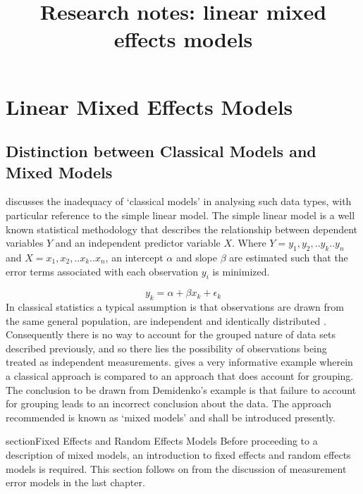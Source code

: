 \documentclass[12pt, a4paper]{report}
\title{Research notes: linear mixed effects models}
\author{ } \date{ }
\theoremstyle{plain}
\theoremstyle{definition}
\theoremstyle{remark}
\begin{document}
	\tableofcontents
\chapter{Linear Mixed Effects Models}

\section{Distinction between Classical Models and Mixed Models}
\citet{Demi} discusses the inadequacy of `classical models' in
analysing such data types, with particular reference to the simple
linear model. The simple linear model is a well known statistical
methodology that describes the relationship between dependent
variables $Y$ and an independent predictor variable $X$. Where
$Y={y_{1},y_{2},..y_{k}..y_{n}}$ and
$X={x_{1},x_{2},..x_{k}..x_{n}}$, an intercept $\alpha$ and slope
$\beta$ are estimated such that the error terms associated with
each observation $y_{i}$ is minimized.

\begin{equation}
y_{k} = \alpha + \beta x_{k}+ \epsilon_{k}
\end{equation}
In classical statistics a typical assumption is that observations
are drawn from the same general population, are independent and
identically distributed \citep{Demi}. Consequently there is no way
to account for the grouped nature of data sets described
previously, and so there lies the possibility of observations
being treated as independent measurements. \citet[pg.3]{Demi}
gives a very informative example wherein a classical approach is
compared to an approach that does account for grouping. The
conclusion to be drawn from Demidenko's example is that failure to
account for grouping leads to an incorrect conclusion about the
data. The approach recommended is known as `mixed models' and
shall be introduced presently.

section{Fixed Effects and Random Effects Models}
Before proceeding to a description of mixed models, an
introduction to fixed effects and random effects models is
required. This section follows on from the discussion of
measurement error models in the last chapter.

\end{document}
